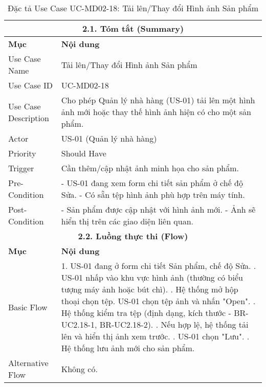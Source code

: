 \begin{longtable}{|m{4cm}|p{11cm}|}
\caption{Đặc tả Use Case UC-MD02-18: Tải lên/Thay đổi Hình ảnh Sản phẩm} \label{tab:uc_md02_18_revised} \\
\hline
\multicolumn{2}{|c|}{\textbf{2.1. Tóm tắt (Summary)}} \\
\hline
\textbf{Mục} & \textbf{Nội dung} \\
\hline
\endhead %
\hline
\endfoot %
\hline
\endlastfoot %
Use Case Name & Tải lên/Thay đổi Hình ảnh Sản phẩm \\
\hline
Use Case ID & UC-MD02-18 \\
\hline
Use Case Description & Cho phép Quản lý nhà hàng (US-01) tải lên một hình ảnh mới hoặc thay thế hình ảnh hiện có cho một sản phẩm. \\
\hline
Actor & US-01 (Quản lý nhà hàng) \\
\hline
Priority & Should Have \\
\hline
Trigger & Cần thêm/cập nhật ảnh minh họa cho sản phẩm. \\
\hline
Pre-Condition & - US-01 đang xem form chi tiết sản phẩm ở chế độ Sửa. \newline - Có sẵn tệp hình ảnh phù hợp trên máy tính. \\
\hline
Post-Condition & - Sản phẩm được cập nhật với hình ảnh mới. \newline - Ảnh sẽ hiển thị trên các giao diện liên quan. \\
\hline
\multicolumn{2}{|c|}{\textbf{2.2. Luồng thực thi (Flow)}} \\
\hline
\textbf{Mục} & \textbf{Nội dung} \\
\hline
Basic Flow & 1. US-01 đang ở form chi tiết Sản phẩm, chế độ Sửa. \newline 2. US-01 nhấp vào khu vực hình ảnh (thường có biểu tượng máy ảnh hoặc bút chì). \newline 3. Hệ thống mở hộp thoại chọn tệp. US-01 chọn tệp ảnh và nhấn "Open". \newline 4. Hệ thống kiểm tra tệp (định dạng, kích thước - BR-UC2.18-1, BR-UC2.18-2). \newline 5. Nếu hợp lệ, hệ thống tải lên và hiển thị ảnh xem trước. \newline 6. US-01 chọn "Lưu". \newline 7. Hệ thống lưu ảnh mới cho sản phẩm. \\
\hline
Alternative Flow & Không có. \\
\hline

\end{longtable}
